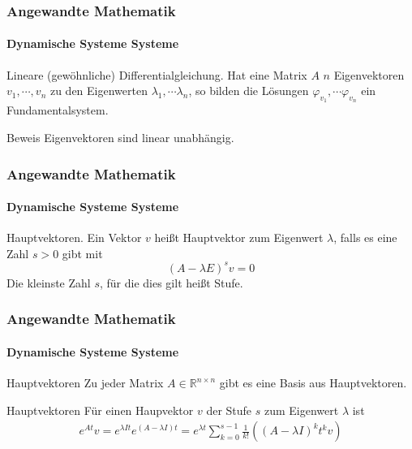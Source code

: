 \documentclass{beamer}
\begin{document}
\begin{frame}
    \frametitle{Angewandte Mathematik}
\framesubtitle{Dynamische Systeme Systeme}
\begin{block}{Lineare (gewöhnliche) Differentialgleichung.}
Hat eine Matrix $A$ $n$ Eigenvektoren $v_1, \cdots , v_n$ zu den Eigenwerten $\lambda_1, \cdots  \lambda_n$, 
so bilden die Lösungen $ \varphi_{v_1}, \cdots  \varphi_{v_n}$ ein Fundamentalsystem.
\end{block}
\begin{block}{Beweis}
Eigenvektoren sind linear unabhängig.
\end{block}
 \end{frame}


\begin{frame}
    \frametitle{Angewandte Mathematik}
\framesubtitle{Dynamische Systeme Systeme}
\begin{block}{Hauptvektoren.}
Ein Vektor $v$ heißt Hauptvektor zum Eigenwert $\lambda$, falls es eine Zahl $s>0$ gibt mit 
$$ (A - \lambda E)^s v = 0$$
Die kleinste Zahl $s$, für die dies gilt heißt Stufe.
\end{block}

 \end{frame}


\begin{frame}
    \frametitle{Angewandte Mathematik}
\framesubtitle{Dynamische Systeme Systeme}
\begin{block}{Hauptvektoren}
Zu jeder Matrix $A \in \mathbb{R}^{n \times n}$ gibt es eine Basis aus Hauptvektoren. 
\end{block}

\begin{block}{Hauptvektoren}
    Für einen Haupvektor $v$ der Stufe $s$ zum Eigenwert $\lambda$ ist
    \begin{align*}
       e^{A t} v = e^{\lambda I t}e^{(A - \lambda I)t} = e^{\lambda t} \sum_{k=0}^{s-1} \frac{1}{k!}((A - \lambda I)^k t^k v)
    \end{align*}
\end{block}

\end{frame}
\end{document}
